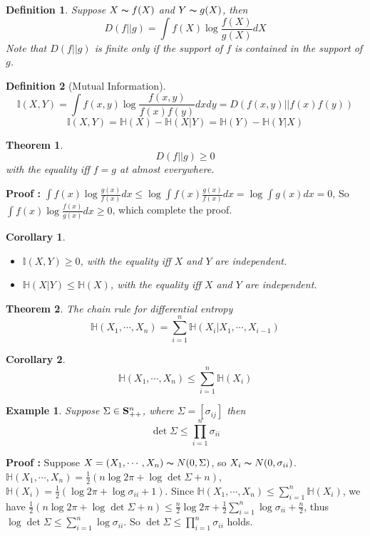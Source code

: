 \documentclass[11pt]{article}
\def\BS{{\bf S}}
\newtheorem{theorem}{Theorem}[section]
\newtheorem{definition}{Definition}[section]
\newtheorem{corollary}{Corollary}[section]
\newtheorem{example}{Example}[section]
\begin{document}
\begin{definition}
Suppose $X \thicksim f(X)$ and $Y \thicksim g(X)$, then
$$D(f||g)=\int f(X)\log \frac{f(X)}{g(X)}dX$$
Note that $D(f||g)$ is finite only if the support of $f$ is contained in the support of $g$.
\end{definition}
\begin{definition}[Mutual Information]
$$\mathbb{I}(X,Y)=\int f(x,y)\log \frac{f(x,y)}{f(x)f(y)}dxdy=D(f(x,y)||f(x)f(y))$$
$$\mathbb{I}(X,Y)=\mathbb{H}(X)-\mathbb{H}(X|Y)=\mathbb{H}(Y)-\mathbb{H}(Y|X)$$
\end{definition}
\begin{theorem}
$$D(f||g)\geq0$$ with the equality iff $f=g$ at almost everywhere.
\end{theorem}
{\bf Proof :} $\int f(x)\log \frac{g(x)}{f(x)}dx\leq \log \int f(x)\frac{g(x)}{f(x)}dx=\log \int g(x)dx=0$, So $\int f(x)\log \frac{f(x)}{g(x)}dx\geq0$, which complete the proof.
\begin{corollary}
\quad \
\begin{itemize}
\item $\mathbb{I}(X,Y)\geq0$, with the equality iff $X$ and $Y$ are independent.
\item $\mathbb{H}(X|Y)\leq\mathbb{H}(X)$, with the equality iff $X$ and $Y$ are independent.
\end{itemize}
\end{corollary}
\begin{theorem}
The chain rule for differential entropy
$$\mathbb{H}(X_{1},\cdots,X_{n})=\sum\limits_{i=1}^{n}\mathbb{H}(X_{i}|X_{1},\cdots,X_{i-1})$$
\end{theorem}
\begin{corollary}
$$\mathbb{H}(X_{1},\cdots,X_{n})\leq\sum\limits_{i=1}^{n}\mathbb{H}(X_{i})$$
\end{corollary}
\begin{example}
Suppose $\Sigma \in \BS_{++}^{n}$, where $\Sigma=[\sigma_{ij}]$ then
$$\det \Sigma \leq \prod\limits_{i=1}^{n} \sigma_{ii}$$
\end{example}
{\bf Proof :} Suppose $X=(X_{1},\cdots,X_{n})\thicksim N(0,\Sigma)$, so $X_{i} \thicksim N(0,\sigma_{ii})$. $\mathbb{H}(X_{1},\cdots,X_{n})=\frac{1}{2}(n\log 2\pi +\log \det\Sigma+n)$, $\mathbb{H}(X_{i})=\frac{1}{2}(\log 2\pi +\log \sigma_{ii}+1)$. Since $\mathbb{H}(X_{1},\cdots,X_{n})\leq\sum\limits_{i=1}^{n}\mathbb{H}(X_{i})$, we have
$\frac{1}{2}(n\log 2\pi +\log \det\Sigma+n)\leq\frac{n}{2}\log 2\pi+\frac{1}{2}\sum\limits_{i=1}^{n}\log \sigma_{ii}+\frac{n}{2}$, thus $\log\det\Sigma\leq\sum\limits_{i=1}^{n}\log \sigma_{ii}$. So $\det \Sigma \leq \prod\limits_{i=1}^{n}\sigma_{ii}$ holds.
\end{document}
